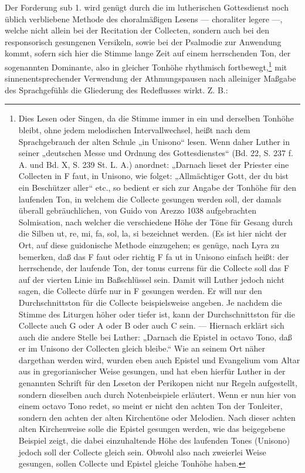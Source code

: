 Der Forderung sub 1. wird genügt durch die im lutherischen Gottesdienst noch üblich verbliebene Methode des choralmäßigen Lesens — choraliter legere —, welche nicht allein bei der Recitation der Collecten, sondern auch bei den responsorisch gesungenen Versikeln, sowie bei der Psalmodie zur Anwendung kommt, sofern sich hier die Stimme lange Zeit auf einem herrschenden Ton, der sogenannten Dominante, also in gleicher Tonhöhe rhythmisch fortbewegt,\footnote{Dies Lesen oder Singen, da die Stimme immer in ein und derselben Tonhöhe bleibt, ohne jedem melodischen Intervallwechsel, heißt nach dem Sprachgebrauch der alten Schule „in Unisono“ lesen. Wenn daher Luther in seiner „deutschen Messe und Ordnung des Gottesdienstes“ (Bd. 22, S. 237 f. A. und Bd. X, S. 239 St. L. A.) anordnet: „Darnach lieset der Priester eine Collecten in F faut, in Unisono, wie folget: „Allmächtiger Gott, der du bist ein Beschützer aller“ etc., so bedient er sich zur Angabe der Tonhöhe für den laufenden Ton, in welchem die Collecte gesungen werden soll, der damals überall gebräuchlichen, von Guido von Arezzo 1038 aufgebrachten Solmisation, nach welcher die verschiedene Höhe der Töne für Gesang durch die Silben ut, re, mi, fa, sol, la, si bezeichnet werden. (Es ist hier nicht der Ort, auf diese guidonische Methode einzugehen; es genüge, nach Lyra zu bemerken, daß das F faut oder richtig F fa ut in Unisono einfach heißt: der herrschende, der laufende Ton, der tonus currens für die Collecte soll das F auf der vierten Linie im Baßschlüssel sein. Damit will Luther jedoch nicht sagen, die Collecte dürfe nur in F gesungen werden. Er will nur den Durchschnittston für die Collecte beispielsweise angeben. Je nachdem die Stimme des Liturgen höher oder tiefer ist, kann der Durchschnittston für die Collecte auch G oder A oder B oder auch C sein. — Hiernach erklärt sich auch die andere Stelle bei Luther: „Darnach die Epistel in octavo Tono, daß er im Unisono der Collecten gleich bleibe.“ Wie an seinem Ort näher dargethan werden wird, wurden eben auch Epistel und Evangelium vom Altar aus in gregorianischer Weise gesungen, und hat eben hierfür Luther in der genannten Schrift für den Leseton der Perikopen nicht nur Regeln aufgestellt, sondern dieselben auch durch Notenbeispiele erläutert. Wenn er nun hier von einem octavo Tono redet, so meint er nicht den achten Ton der Tonleiter, sondern den achten der alten Kirchentöne oder Melodien. Nach dieser achten alten Kirchenweise solle die Epistel gesungen werden, wie das beigegebene Beispiel zeigt, die dabei einzuhaltende Höhe des laufenden Tones (Unisono) jedoch soll der Collecte gleich sein. Obwohl also nach zweierlei Weise gesungen, sollen Collecte und Epistel gleiche Tonhöhe haben.} mit sinnenentsprechender
Verwendung der Athmungspausen nach alleiniger Maßgabe des Sprachgefühls die Gliederung des Redeflusses wirkt. Z. B.:

